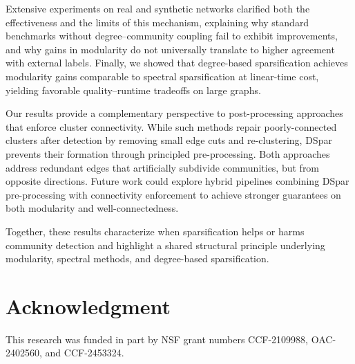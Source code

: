 \documentclass[10pt,journal,compsoc]{IEEEtran}
\begin{document}
Extensive experiments on real and synthetic networks clarified both the effectiveness and the limits of this mechanism, explaining why standard benchmarks without degree–community coupling fail to exhibit improvements, and why gains in modularity do not universally translate to higher agreement with external labels. Finally, we showed that degree-based sparsification achieves modularity gains comparable to spectral sparsification at linear-time cost, yielding favorable quality–runtime tradeoffs on large graphs. 

Our results provide a complementary perspective to post-processing approaches that enforce cluster connectivity. While such methods repair poorly-connected clusters after detection by removing small edge cuts and re-clustering, DSpar prevents their formation through principled pre-processing. Both approaches address redundant edges that artificially subdivide communities, but from opposite directions. Future work could explore hybrid pipelines combining DSpar pre-processing with connectivity enforcement to achieve stronger guarantees on both modularity and well-connectedness.

Together, these results characterize when sparsification helps or harms community detection and highlight a shared structural principle underlying modularity, spectral methods, and degree-based sparsification.




\section*{Acknowledgment}

This research was funded in part by NSF grant numbers CCF-2109988, OAC-2402560, and CCF-2453324.

\appendix






\end{document}
